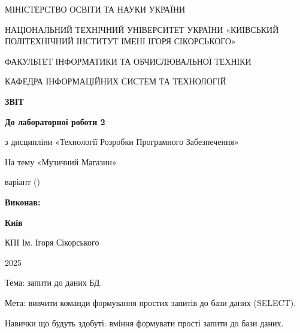 \documentclass{article}
\begin{document}
    \begin{titlepage}
        \begin{center}
            {\Large
                МІНІСТЕРСТВО ОСВІТИ ТА НАУКИ УКРАЇНИ

                НАЦІОНАЛЬНИЙ ТЕХНІЧНИЙ УНІВЕРСИТЕТ УКРАЇНИ
                «КИЇВСЬКИЙ ПОЛІТЕХНІЧНИЙ ІНСТИТУТ ІМЕНІ ІГОРЯ СІКОРСЬКОГО»

                ФАКУЛЬТЕТ ІНФОРМАТИКИ ТА ОБЧИСЛЮВАЛЬНОЇ ТЕХНІКИ

                КАФЕДРА ІНФОРМАЦІЙНИХ СИСТЕМ ТА ТЕХНОЛОГІЙ
            }


            \vspace{60mm}
            {\large
                \textbf{ЗВІТ}

                \vspace{5mm}

                \textbf{До лабораторної роботи 2}

                \vspace{5mm}

                з дисципліни «Технології Розробки Програмного Забезпечення»
            }

            На тему «Музичний Магазин»

            варіант  ()
        \end{center}

        \vfill
        \hfill
        \begin{minipage}[t]{0.35\textwidth}
            \textbf{Виконав:}
        \end{minipage}

        \vfill

        \begin{center}
            {\bf
                Київ

                КПІ Ім. Ігоря Сікорського

                2025
            }
        \end{center}
    \end{titlepage}
    \newpage

    Тема: запити до даних БД.

    Мета: вивчити команди формування простих запитів до бази даних (SELECT).

    Навички що будуть здобуті: вміння формувати прості запити до бази даних.
\end{document}
